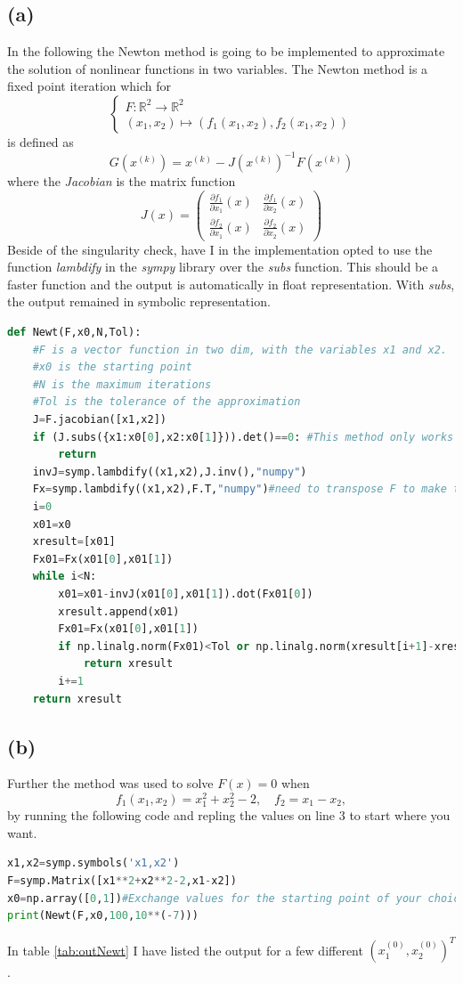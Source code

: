 \documentclass[12pt, a4paper,usenames,dvipsnames]{article}
\begin{document}
\subsection*{(a)}
In the following the Newton method is going to be implemented to approximate the solution of nonlinear functions in two variables. The Newton method is a fixed point iteration which for \[\left\{\begin{array}{l}
    F:\mathbb{R}^2\rightarrow \mathbb{R}^2   \\
    (x_1,x_2)\mapsto (f_1(x_1,x_2),f_2(x_1,x_2)) 
\end{array}\right.\] is defined as
\begin{equation*}
    G(x^{(k)})=x^{(k)}-J(x^{(k)})^{-1}F(x^{(k)})
\end{equation*}
where the \textit{Jacobian} is the matrix function
\[J(x)=\left(\begin{array}{cc}
     \frac{\partial f_1}{\partial x_1}(x)& \frac{\partial f_1}{\partial x_2}(x) \\
     \frac{\partial f_2}{\partial x_1}(x)&\frac{\partial f_2}{\partial x_2}(x) 
\end{array}\right)\]
Beside of the singularity check, have I in the implementation opted to use the function \textit{lambdify} in the \textit{sympy} library over the \textit{subs} function. This should be a faster function and the output is automatically in float representation. With \textit{subs}, the output remained in symbolic representation. 
\begin{lstlisting}[language=Python]
def Newt(F,x0,N,Tol):
    #F is a vector function in two dim, with the variables x1 and x2.
    #x0 is the starting point
    #N is the maximum iterations
    #Tol is the tolerance of the approximation
    J=F.jacobian([x1,x2])
    if (J.subs({x1:x0[0],x2:x0[1]})).det()==0: #This method only works if the jacobian is nonsingular in a neighbourhood of x0
        return 
    invJ=symp.lambdify((x1,x2),J.inv(),"numpy")
    Fx=symp.lambdify((x1,x2),F.T,"numpy")#need to transpose F to make the dimensions for multiplication right
    i=0
    x01=x0
    xresult=[x01]
    Fx01=Fx(x01[0],x01[1])
    while i<N:
        x01=x01-invJ(x01[0],x01[1]).dot(Fx01[0])
        xresult.append(x01)
        Fx01=Fx(x01[0],x01[1])
        if np.linalg.norm(Fx01)<Tol or np.linalg.norm(xresult[i+1]-xresult[i])<Tol:
            return xresult
        i+=1
    return xresult
\end{lstlisting}
\subsection*{(b)}
Further the method was used to solve \(F(x)=0\) when
\[f_1(x_1,x_2)=x_1^2+x_2^2-2, \quad f_2=x_1-x_2,\]
by running the following code and repling the values on line 3 to start where you want.
\begin{lstlisting}[language=Python]
x1,x2=symp.symbols('x1,x2')
F=symp.Matrix([x1**2+x2**2-2,x1-x2])
x0=np.array([0,1])#Exchange values for the starting point of your choice
print(Newt(F,x0,100,10**(-7)))
\end{lstlisting}
In table \ref{tab:outNewt} I have listed the output for a few different \((x_1^{(0)},x_2^{(0)})^T\).
\end{document}
